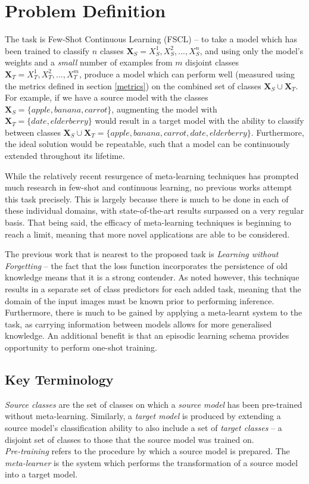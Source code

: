 \documentclass{report}
\begin{document}
\chapter{Problem Definition} \label{problem-definition}
The task is Few-Shot Continuous Learning (FSCL) -- to take a model which has been trained to classify $n$ classes $\bm{X}_S = {X_S^1, X_S^2, ..., X_S^n}$, and using only the model's weights and a \emph{small} number of examples from $m$ disjoint classes $\bm{X}_T = {X_T^1, X_T^2, ..., X_T^m}$, produce a model which can perform well (measured using the metrics defined in section \ref{metrics}) on the combined set of classes $\bm{X}_S \cup \bm{X}_T$. For example, if we have a source model with the classes $\bm{X}_S = \lbrace apple, banana, carrot \rbrace$, augmenting the model with $\bm{X}_T = \lbrace date, elderberry \rbrace$ would result in a target model with the ability to classify between classes $\bm{X}_S \cup \bm{X}_T = \lbrace apple, banana, carrot, date, elderberry \rbrace$.
Furthermore, the ideal solution would be repeatable, such that a model can be continuously extended throughout its lifetime. \par
While the relatively recent resurgence of meta-learning techniques has prompted much research in few-shot and continuous learning, no previous works attempt this task precisely. This is largely because there is much to be done in each of these individual domains, with state-of-the-art results surpassed on a very regular basis. That being said, the efficacy of meta-learning techniques is beginning to reach a limit, meaning that more novel applications are able to be considered.	\par
The previous work that is nearest to the proposed task is \textit{Learning without Forgetting}\parencite{lwf} -- the fact that the loss function incorporates the persistence of old knowledge means that it is a strong contender. As noted however, this technique results in a separate set of class predictors for each added task, meaning that the domain of the input images must be known prior to performing inference. Furthermore, there is much to be gained by applying a meta-learnt system to the task, as carrying information between models allows for more generalised knowledge. An additional benefit is that an episodic learning schema provides opportunity to perform one-shot training. \par

\section{Key Terminology}
\textit{Source classes} are the set of classes on which a \textit{source model} has been pre-trained without meta-learning. Similarly, a \textit{target model} is produced by extending a source model's classification ability to also include a set of \textit{target classes} -- a disjoint set of classes to those that the source model was trained on. \\
\textit{Pre-training} refers to the procedure by which a source model is prepared. The \textit{meta-learner} is the system which performs the transformation of a source model into a target model.
\end{document}

